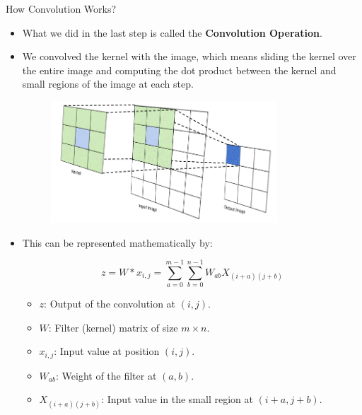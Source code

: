 \documentclass[10pt]{beamer}
\theoremstyle{remark}
\theoremstyle{definition}
\begin{document}
\begin{frame}[allowframebreaks]{How Convolution Works?}
\begin{itemize}
    \item What we did in the last step is called the \textbf{Convolution Operation}.
    \item We convolved the kernel with the image, which means sliding the kernel over the entire image and computing the dot product between the kernel and small regions of the image at each step.
    \begin{figure}
\centering
\includegraphics[width=0.8\textwidth,height=0.8\textheight,keepaspectratio]{./images/convolve.png}
\end{figure}

\end{itemize}



\framebreak

\begin{itemize}
    \item This can be represented mathematically by:
    
    \[
    z = W * x_{i,j} = \sum_{a=0}^{m-1} \sum_{b=0}^{n-1} W_{ab} X_{(i+a)(j+b)}
    \]
    \begin{itemize}
    \item $z$: Output of the convolution at $(i, j)$.
    \item $W$: Filter (kernel) matrix of size $m \times n$.
    \item $x_{i,j}$: Input value at position $(i, j)$.
    \item $W_{ab}$: Weight of the filter at $(a, b)$.
    \item $X_{(i+a)(j+b)}$: Input value in the small region at $(i+a, j+b)$.
    \end{itemize}

\end{itemize}



\framebreak


\end{frame}
\end{document}
